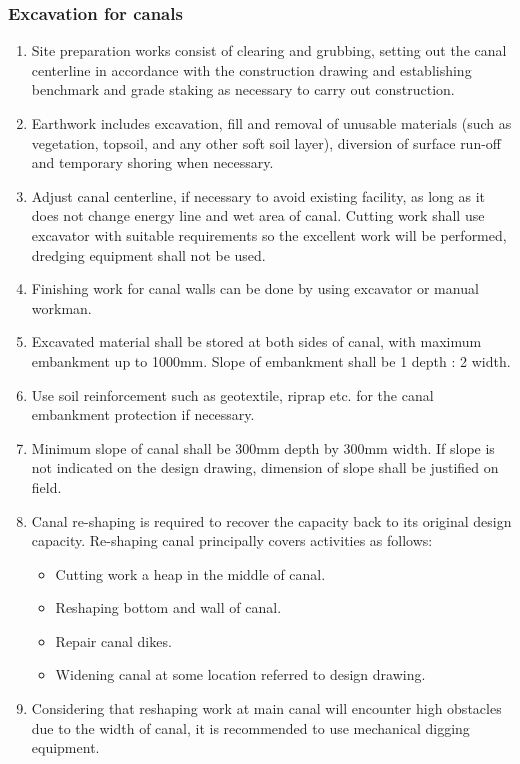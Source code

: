 \documentclass{article}%
\begin{document}
\subsubsection{Excavation for canals}%
\label{ssubsec:Excavationforcanals}%
\begin{enumerate}[label=\alph*),start=1]%
\item%
Site preparation works consist of clearing and grubbing, setting out the canal  centerline  in  accordance  with the  construction  drawing  and establishing benchmark and grade staking as necessary to carry out construction.%
\item%
Earthwork includes excavation, fill and removal of unusable materials (such as vegetation, topsoil, and any other soft soil layer), diversion of surface run{-}off and temporary shoring when necessary.%
\item%
Adjust canal centerline, if necessary to avoid existing facility, as long as it does not change energy line and wet area of canal. Cutting work shall use excavator with suitable requirements so the excellent work will be performed, dredging equipment shall not be used.%
\item%
Finishing work for canal walls can be done by using excavator or manual workman.%
\item%
Excavated material shall be stored at both sides of canal, with maximum embankment up to 1000mm. Slope of embankment shall be 1 depth : 2 width.%
\item%
Use soil reinforcement such as geotextile, riprap etc. for the canal embankment protection if necessary.%
\item%
Minimum slope of canal shall be 300mm depth by 300mm width. If slope is not indicated on the design drawing, dimension of slope shall be justified on field.%
\item%
Canal re{-}shaping is required to recover the capacity back to its original design capacity. Re{-}shaping canal principally covers activities  as follows:%
\begin{itemize}%
\item%
Cutting work a heap in the middle of canal.%
\item%
Reshaping bottom and wall of canal.%
\item%
Repair canal dikes.%
\item%
Widening canal at some location referred to design drawing.%
\end{itemize}%
\item%
Considering that reshaping work at main canal will encounter high obstacles due to the  width of canal, it is recommended to use mechanical digging equipment.%
\end{enumerate}
\end{document}
